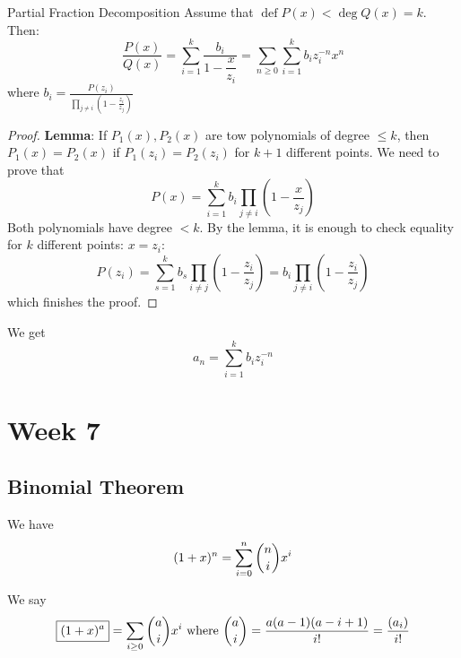 \documentclass{report}
\begin{document}
\begin{theorem}{Partial Fraction Decomposition}
    Assume that $\mathop{def}P(x) <  \mathop{deg}Q(x) = k$. Then:
        \begin{equation*}
            \dfrac{P(x)}{Q(x)} = \sum_{i = 1}^{k}\dfrac{b_{i}}{1 - \dfrac{x}{z_{i}}} = \sum_{n \geq 0} \sum_{i = 1}^{k}b_{i}z_{i}^{-n}x^{n}
        \end{equation*}
    where $b_{i} = \frac{P(z_{i})}{\prod_{j \neq i}^{} (1 - \frac{z_{i}}{z_{j}})}$
\end{theorem}
    \begin{proof}
        \textbf{Lemma}: If $P_{1}(x), P_{2}(x)$ are tow polynomials of degree $ \leq k$, then $P_{1}(x) = P_{2}(x)$ if $P_{1}(z_{i}) = P_{2}(z_{i})$ for $k + 1$ different points. We need to prove that
            \begin{equation*}
                P(x) = \sum_{i = 1}^{k}b_{i}\prod_{j \neq i}^{} (1 - \dfrac{x}{z_{j}})
            \end{equation*}
        Both polynomials have degree $< k$. By the lemma, it is enough to check equality for $k$ different points: $x = z_{i}$:
            \begin{equation*}
                P(z_{i}) = \sum_{s = 1}^{k} b_{s}\prod_{i \neq j}^{} (1 - \dfrac{z_{i}}{z_{j}}) = b_{i}\prod_{j \neq i}^{} (1 - \dfrac{z_{i}}{z_{j}})
            \end{equation*}
        which finishes the proof. 
    \end{proof}
We get
    \begin{equation*}
        a_{n} = \sum_{i = 1}^{k}b_{i}z^{-n}_{i}
    \end{equation*}

\chapter{Week 7}

\begin{topic}
    \section{Binomial Theorem}
\end{topic}

We have
    \begin{equation*}
        (1 + x)^{n} = \sum_{i = 0}^{n} \dbinom{n}{i}x^{i}
    \end{equation*}

\begin{theorem}{}
    We say
        \begin{equation*}
            \boxed{(1 + x)^{a}} = \sum_{i \geq 0} \dbinom{a}{i}x^{i} \text{ where $\dbinom{a}{i} = \dfrac{a(a - 1)(a - i + 1)}{i!} = \dfrac{(a_{i})}{i!}$}
        \end{equation*}
\end{theorem}
\end{document}
